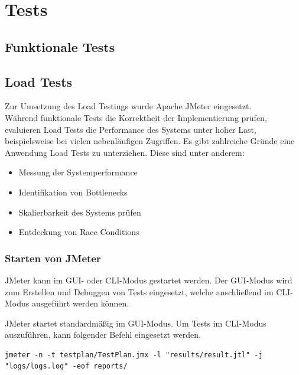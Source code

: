 \chapter{Tests}

\section{Funktionale Tests}\label{sec:tests-functional}


\clearpage
\section{Load Tests}\label{sec:tests-load}
Zur Umsetzung des Load Testings wurde Apache JMeter eingesetzt.\\

Während funktionale Tests die Korrektheit der Implementierung prüfen,
evaluieren Load Tests die Performance des Systems unter hoher Last,
beispielsweise bei vielen nebenläufigen Zugriffen.
Es gibt zahlreiche Gründe eine Anwendung Load Tests zu unterziehen.
Diese sind unter anderem:

\begin{itemize}
    \item Messung der Systemperformance
    \item Identifikation von Bottlenecks
    \item Skalierbarkeit des Systems prüfen
    \item Entdeckung von Race Conditions
\end{itemize}

\subsection{Starten von JMeter}

JMeter kann im GUI- oder CLI-Modus gestartet werden.
Der GUI-Modus wird zum Erstellen und Debuggen von Tests eingesetzt,
welche anschließend im CLI-Modus ausgeführt werden können.

JMeter startet standardmäßig im GUI-Modus.
Um Tests im CLI-Modus auszuführen, kann folgender Befehl eingesetzt werden.

\begin{lstlisting}[caption=Beispielkonfiguration des CLI-Modus]
    jmeter -n -t testplan/TestPlan.jmx -l "results/result.jtl" -j "logs/logs.log" -eof reports/
\end{lstlisting}

